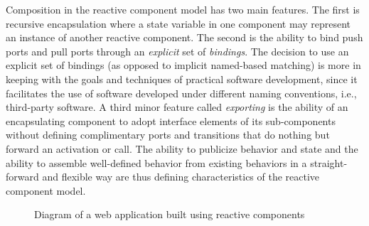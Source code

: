 Composition in the reactive component model has two main features.
The first is recursive encapsulation where a state variable in one component may represent an instance of another reactive component.
The second is the ability to bind push ports and pull ports through an \emph{explicit} set of \emph{bindings}.
The decision to use an explicit set of bindings (as opposed to implicit named-based matching) is more in keeping with the goals and techniques of practical software development, since it facilitates the use of software developed under different naming conventions, i.e., third-party software.
A third minor feature called \emph{exporting} is the ability of an encapsulating component to adopt interface elements of its sub-components without defining complimentary ports and transitions that do nothing but forward an activation or call.
The ability to publicize behavior and state and the ability to assemble well-defined behavior from existing behaviors in a straight-forward and flexible way are thus defining characteristics of the reactive component model.

\begin{figure}
\centering
{}%
\caption{Diagram of a web application built using reactive components\label{web_server}}
\end{figure}

